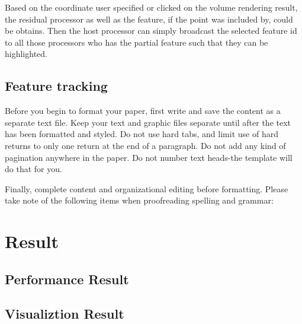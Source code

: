 \documentclass[10pt, conference, compsocconf]{IEEEtran}
\begin{document}
Based on the coordinate user specified or clicked on the volume rendering result, the residual processor as well as the feature, if the point was included by, could be obtains. Then the host processor can simply broadcast the selected feature id to all those processors who has the partial feature such that they can be highlighted.


\subsection{Feature tracking}
Before you begin to format your paper, first write and save the content as a separate text file. Keep your text and graphic files separate until after the text has been formatted and styled. Do not use hard tabs, and limit use of hard returns to only one return at the end of a paragraph. Do not add any kind of pagination anywhere in the paper. Do not number text heads-the template will do that for you.

Finally, complete content and organizational editing before formatting. Please take note of the following items when proofreading spelling and grammar:

\section{Result}
\subsection{Performance Result}
\subsection{Visualiztion Result}
\end{document}
